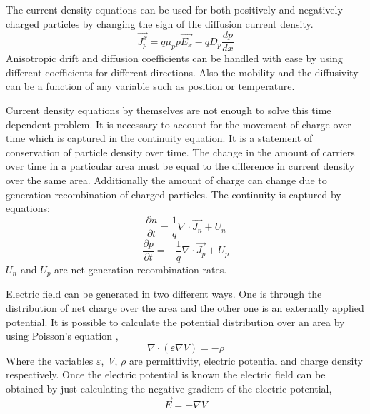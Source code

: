 \begin{doublespace}
The current density equations can be used for both positively and negatively charged particles by changing the sign of the diffusion current density.
\begin{equation}
\vec{J_p^x}=q \mu_{p} p \vec{E_x}-qD_{p} \frac{dp}{dx} 
\label{cdenp}
\end{equation}
Anisotropic drift and diffusion coefficients can be handled with ease by using different coefficients for different directions. Also the mobility and the diffusivity can be a function of any variable such as position or temperature.

Current density equations by themselves are not enough to solve this time dependent problem. It is necessary to account for the movement of charge over time which is captured in the continuity equation. It is a statement of conservation of particle density over time. The change in the amount of carriers over time in a particular area must be equal to the difference in current density over the same area. Additionally the amount of charge can change due to generation-recombination of charged particles. The continuity is captured by equations:
\begin{equation}
\frac{\partial n}{\partial t}=\frac{1}{q}\nabla \cdot \vec{J_n}+U_{n}
\label{conn}
\end{equation}
\begin{equation}
\frac{\partial p}{\partial t}=-\frac{1}{q}\nabla \cdot \vec{J_p}+U_{p}
\label{conp}
\end{equation}
$U_{n}$ and $U_{p}$ are net generation recombination rates.  

Electric field can be generated in two different ways. One is through the distribution of net charge over the area and the other one is an externally applied potential. It is possible to calculate the potential distribution over an area by using Poisson's equation \cite{Dragica1},
\begin{equation}
\nabla \cdot  (\varepsilon \nabla V)=-\rho
\label{poisson}
\end{equation}
Where the variables \textit{$\varepsilon$}, \textit{V}, \textit{$\rho$} are permittivity, electric potential and charge density respectively. Once the electric potential is known the electric field can be obtained by just calculating the negative gradient of the electric potential,
\begin{equation}
\vec{E}=-\nabla V
\label{Efield}
\end{equation}


\end{doublespace}
